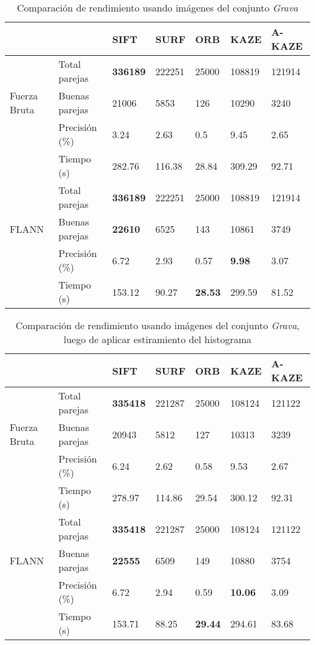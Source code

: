 \begin{table}[h]
	\centering
	\caption{Comparación de rendimiento usando imágenes del conjunto \textit{Grava}}
	\label{geotagg}
	\begin{tabular}{@{}lllllll@{}}
		\toprule
		&                      				& SIFT 			& SURF & ORB & KAZE  & A-KAZE  \\ \midrule 
			   \hfill\vline& Total parejas  &\textbf{336189}& 222251&25000&108819& 121914   \\
		Fuerza Bruta \vline& Buenas parejas & 21006			& 5853 & 126 & 10290 & 3240  \\
			   \hfill\vline& Precisión (\%) & 3.24			&2.63  & 0.5   & 9.45& 2.65  \\
				\vspace{0.3cm}
			   \hfill\vline& Tiempo (s)     & 282.76		&116.38 & 28.84 &309.29 & 92.71   \\
		
			   \hfill\vline& Total parejas  &\textbf{336189}& 222251&25000			&108819				& 121914   \\
		FLANN  \hfill\vline& Buenas parejas &\textbf{22610} & 6525 & 143			& 10861				& 3749    \\
			   \hfill\vline& Precisión (\%) & 6.72			& 2.93 &0.57  			& \textbf{9.98} 	& 3.07    \\ 
			   \hfill\vline& Tiempo (s)     & 153.12		& 90.27& \textbf{28.53}	& 299.59			& 81.52   \\ 
		\bottomrule
	\end{tabular}
\end{table}
\begin{table}[h]
	\centering
	\caption{Comparación de rendimiento usando imágenes del conjunto \textit{Grava}, luego de aplicar estiramiento del histograma}
	\label{geotagg-2}
	\begin{tabular}{@{}lllllll@{}}
		\toprule
		&                      				& SIFT 			& SURF & ORB & KAZE  & A-KAZE  \\ \midrule 
		\hfill\vline& Total parejas  &\textbf{335418}		& 221287&25000&108124& 121122   \\
		Fuerza Bruta \vline& Buenas parejas & 20943			& 5812 & 127 & 10313 & 3239  \\
		\hfill\vline& Precisión (\%) & 6.24			&2.62  & 0.58  & 9.53& 2.67  \\
		\vspace{0.3cm}
		\hfill\vline& Tiempo (s)     & 278.97		&114.86 & 29.54 &300.12 & 92.31   \\
		
		\hfill\vline& Total parejas  &\textbf{335418}& 221287&25000			&108124				& 121122   \\
		FLANN  \hfill\vline& Buenas parejas &\textbf{22555} & 6509 & 149	& 10880				& 3754    \\
		\hfill\vline& Precisión (\%) & 6.72			& 2.94 &0.59  			& \textbf{10.06} 	& 3.09   \\ 
		\hfill\vline& Tiempo (s)     & 153.71		& 88.25& \textbf{29.44}	& 294.61			& 83.68   \\ 
		\bottomrule
	\end{tabular}
\end{table}



